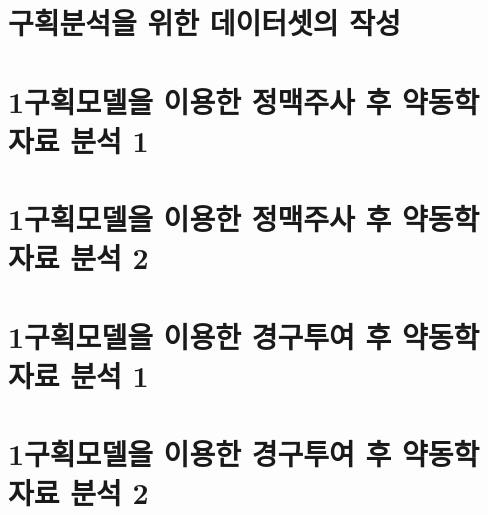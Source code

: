\documentclass[
  11pt,
  krantz2, a4paper, twoside]{krantz}
\begin{document}
\hypertarget{uxad6cuxd68duxbd84uxc11duxc744-uxc704uxd55c-uxb370uxc774uxd130uxc14buxc758-uxc791uxc131}{%
\section{구획분석을 위한 데이터셋의 작성}\label{uxad6cuxd68duxbd84uxc11duxc744-uxc704uxd55c-uxb370uxc774uxd130uxc14buxc758-uxc791uxc131}}

\hypertarget{uxad6cuxd68duxbaa8uxb378uxc744-uxc774uxc6a9uxd55c-uxc815uxb9e5uxc8fcuxc0ac-uxd6c4-uxc57duxb3d9uxd559-uxc790uxb8cc-uxbd84uxc11d-1}{%
\section{1구획모델을 이용한 정맥주사 후 약동학 자료 분석 1}\label{uxad6cuxd68duxbaa8uxb378uxc744-uxc774uxc6a9uxd55c-uxc815uxb9e5uxc8fcuxc0ac-uxd6c4-uxc57duxb3d9uxd559-uxc790uxb8cc-uxbd84uxc11d-1}}

\hypertarget{uxad6cuxd68duxbaa8uxb378uxc744-uxc774uxc6a9uxd55c-uxc815uxb9e5uxc8fcuxc0ac-uxd6c4-uxc57duxb3d9uxd559-uxc790uxb8cc-uxbd84uxc11d-2}{%
\section{1구획모델을 이용한 정맥주사 후 약동학 자료 분석 2}\label{uxad6cuxd68duxbaa8uxb378uxc744-uxc774uxc6a9uxd55c-uxc815uxb9e5uxc8fcuxc0ac-uxd6c4-uxc57duxb3d9uxd559-uxc790uxb8cc-uxbd84uxc11d-2}}

\hypertarget{uxad6cuxd68duxbaa8uxb378uxc744-uxc774uxc6a9uxd55c-uxacbduxad6cuxd22cuxc5ec-uxd6c4-uxc57duxb3d9uxd559-uxc790uxb8cc-uxbd84uxc11d-1}{%
\section{1구획모델을 이용한 경구투여 후 약동학 자료 분석 1}\label{uxad6cuxd68duxbaa8uxb378uxc744-uxc774uxc6a9uxd55c-uxacbduxad6cuxd22cuxc5ec-uxd6c4-uxc57duxb3d9uxd559-uxc790uxb8cc-uxbd84uxc11d-1}}

\hypertarget{uxad6cuxd68duxbaa8uxb378uxc744-uxc774uxc6a9uxd55c-uxacbduxad6cuxd22cuxc5ec-uxd6c4-uxc57duxb3d9uxd559-uxc790uxb8cc-uxbd84uxc11d-2}{%
\section{1구획모델을 이용한 경구투여 후 약동학 자료 분석 2}\label{uxad6cuxd68duxbaa8uxb378uxc744-uxc774uxc6a9uxd55c-uxacbduxad6cuxd22cuxc5ec-uxd6c4-uxc57duxb3d9uxd559-uxc790uxb8cc-uxbd84uxc11d-2}}
\end{document}
